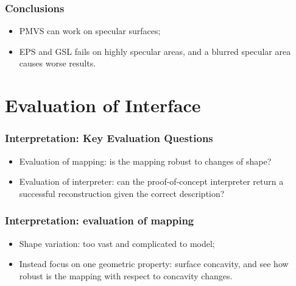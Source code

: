 \documentclass{beamer}
\begin{document}
\begin{frame}
\frametitle{Conclusions}

\begin{itemize}
\item PMVS can work on specular surfaces;
\item EPS and GSL fails on highly specular areas, and a blurred specular area causes worse results.
\end{itemize}

\end{frame}

\section{Evaluation of Interface}
\begin{frame}
\tableofcontents[currentsection,currentsubsection, 
    hideothersubsections, 
    sectionstyle=show/shaded,]
\end{frame}

\begin{frame}
\frametitle{Interpretation: Key Evaluation Questions}

\begin{itemize}
\item Evaluation of mapping: is the mapping robust to changes of shape?
\item Evaluation of interpreter: can the proof-of-concept interpreter return a successful reconstruction given the correct description?
\end{itemize}

\end{frame}

\begin{frame}
\frametitle{Interpretation: evaluation of mapping}

\begin{itemize}
\item Shape variation: too vast and complicated to model;
\item Instead focus on one geometric property: surface concavity, and see how robust is the mapping with respect to concavity changes.
\end{itemize}


\end{frame}
\end{document}
